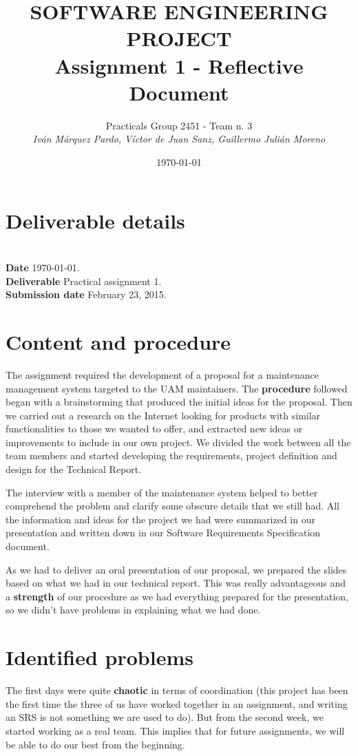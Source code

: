 \documentclass{article}
\title{SOFTWARE ENGINEERING PROJECT\\Assignment 1 - Reflective Document}
\date{\today}
\author{Practicals Group 2451 - Team n. 3 \\ \vspace{5pt} \textit{Iván Márquez Pardo, Víctor de Juan Sanz, Guillermo Julián Moreno}}
\newcommand{\header}[1]{\\ \indent \textbf{#1}\hspace{10pt}}
\begin{document}
\maketitle
\pagestyle{plain}

\section{Deliverable details}

\noindent
\header{Date} \today.
\header{Deliverable} Practical assignment 1.
\header{Submission date} February 23, 2015.

\section{Content and procedure}

The assignment required the development of a proposal for a maintenance management system targeted to the UAM maintainers. The \textbf{procedure} followed began with a brainstorming that produced the initial ideas for the proposal. Then we carried out a research on the Internet looking for products with similar functionalities to those we wanted to offer, and extracted new ideas or improvements to include in our own project. We divided the work between all the team members and started developing the requirements, project definition and design for the Technical Report.

The interview with a member of the maintenance system helped to better comprehend the problem and clarify some obscure details that we still had. All the information and ideas for the project we had were summarized in our presentation and written down in our Software Requirements Specification document.

As we had to deliver an oral presentation of our proposal, we prepared the slides based on what we had in our technical report. This was really advantageous and a \textbf{strength} of our procedure as we had everything prepared for the presentation, so we didn't have problems in explaining what we had done.

\section{Identified problems}

The first days were quite \textbf{chaotic} in terms of coordination (this project has been the first time the three of us have worked together in an assignment, and writing an SRS is not something we are used to do). But from the second week, we started working as a real team. This implies that for future assignments, we will be able to do our best from the beginning.
\end{document}

